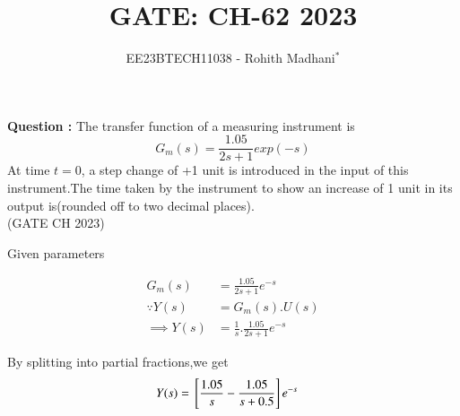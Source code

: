\documentclass[journal,12pt,twocolumn]{IEEEtran}
\theoremstyle{remark}
\begin{document}

\vspace{3cm}

\title{GATE: CH-62 2023}
\author{EE23BTECH11038 - Rohith Madhani$^{*}$%
}
\maketitle
\newpage
\bigskip
\renewcommand{\thefigure}{\theenumi}
\renewcommand{\thetable}{\theenumi}

\textbf{Question :} The transfer function of a measuring instrument is \\
$$G_m(s) = \frac{1.05}{2s+1}exp(-s)$$
At time $t = 0$, a step change of +1 unit is introduced in the input of this instrument.The time taken by the instrument to show an increase of 1 unit in its output is(rounded off to two decimal places). \\ \hfill(GATE CH 2023) \\
\solution
\fi

\begin{table}[!h] 
\centering

\caption{Given parameters}
\label{table:gate23ch62}
\end{table}


\begin{align}
    G_m(s) &= \frac{1.05}{2s+1}e^{-s} \\
    \because Y(s) &= G_m(s).U(s) \\
    \implies Y(s) &= \frac{1}{s}.\frac{1.05}{2s+1}e^{-s}
\end{align}

By splitting into partial fractions,we get
\begin{align}
    Y(s) &= {}\left[\frac{1.05}{s} - \frac{1.05}{s+0.5}\right]e^{-s}
\end{align}
\end{document}
